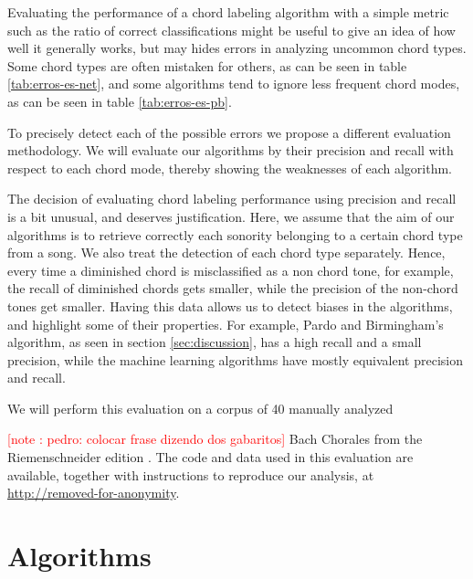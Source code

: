 \documentclass{article}
\newcounter{notecounter}
\newcommand{\note}[1]{
  \addtocounter{notecounter}{1}
  \textcolor{red}{[note \arabic{notecounter}: #1]}
}
\begin{document}
Evaluating the performance of a chord labeling algorithm with a simple
metric such as the ratio of correct classifications might be useful to
give an idea of how well it generally works, but may hides errors in
analyzing uncommon chord types. Some chord types are often mistaken
for others, as can be seen in table \ref{tab:erros-es-net}, and some
algorithms tend to ignore less frequent chord modes, as can be seen in
table \ref{tab:erros-es-pb}.

To precisely detect each of the possible errors we propose a different
evaluation methodology. We will evaluate our algorithms by their
precision and recall with respect to each chord mode, thereby showing
the weaknesses of each algorithm.

The decision of evaluating chord labeling performance using precision
and recall is a bit unusual, and deserves justification. Here, we
assume that the aim of our algorithms is to retrieve correctly each
sonority belonging to a certain chord type from a song. We also treat
the detection of each chord type separately. Hence, every time a
diminished chord is misclassified as a non chord tone, for example,
the recall of diminished chords gets smaller, while the precision of
the non-chord tones get smaller. Having this data allows us to detect
biases in the algorithms, and highlight some of their properties. For
example, Pardo and Birmingham's algorithm, as seen in section
\ref{sec:discussion}, has a high recall and a small precision, while
the machine learning algorithms have mostly equivalent precision and
recall.

We will perform this evaluation on a corpus of 40 manually analyzed
\note{pedro: colocar frase dizendo dos gabaritos} Bach Chorales from
the Riemenschneider edition \cite{bach:371}. The code and data used in
this evaluation are available, together with instructions to reproduce
our analysis, at \url{http://removed-for-anonymity}.

\section{Algorithms}
\label{sec:algorithms}
\end{document}
